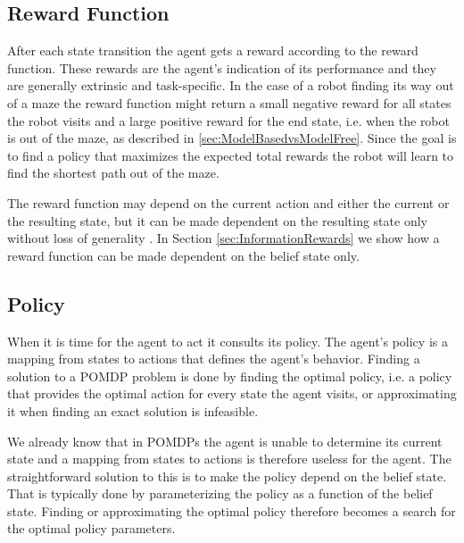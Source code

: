 \subsection{Reward Function}
\label{sec:RewardFunction}
After each state transition the agent gets a reward according to the reward function. These rewards are the agent's indication of its performance and they are generally extrinsic and task-specific. In the case of a robot finding its way out of a maze the reward function might return a small negative reward for all states the robot visits and a large positive reward for the end state, i.e. when the robot is out of the maze, as described in \ref{sec:ModelBasedvsModelFree}. Since the goal is to find a policy that maximizes the expected total rewards the robot will learn to find the shortest path out of the maze.

The reward function may depend on the current action and either the current or the resulting state, but it can be made dependent on the resulting state only without loss of generality \cite{Aberdeen2003}. In Section \ref{sec:InformationRewards} we show how a reward function can be made dependent on the belief state only.

\subsection{Policy}
When it is time for the agent to act it consults its policy. The agent's policy is a mapping from states to actions that defines the agent's behavior. Finding a solution to a POMDP problem is done by finding the optimal policy, i.e. a policy that provides the optimal action for every state the agent visits, or approximating it when finding an exact solution is infeasible.

We already know that in POMDPs the agent is unable to determine its current state and a mapping from states to actions is therefore useless for the agent. The straightforward solution to this is to make the policy depend on the belief state. That is typically done by parameterizing the policy as a function of the belief state. Finding or approximating the optimal policy therefore becomes a search for the optimal policy parameters. 

